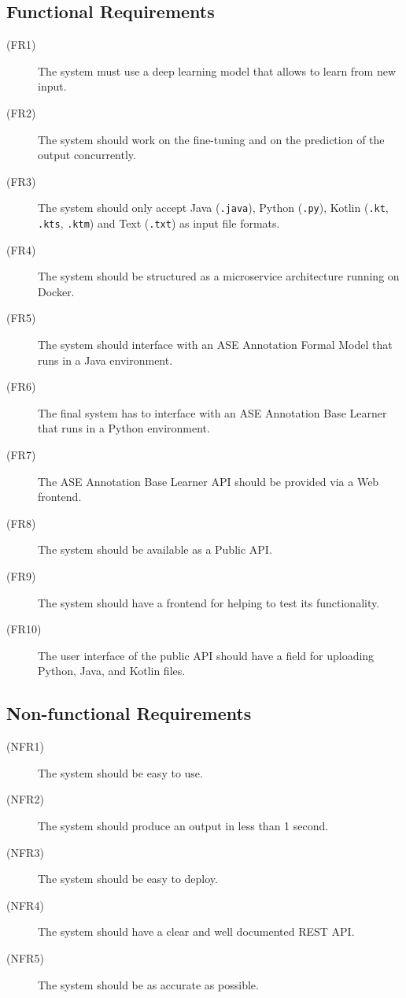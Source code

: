 \documentclass[11pt]{article}
\begin{document}
\subsection{Functional Requirements}
\begin{description}
\item[(FR1)] The system must use a deep learning model that allows to learn from new input.
\item[(FR2)] The system should work on the fine-tuning and on the prediction of the output concurrently.
\item[(FR3)] The system should only accept Java (\texttt{.java}), Python (\texttt{.py}), Kotlin (\texttt{.kt}, \texttt{.kts}, \texttt{.ktm}) and Text (\texttt{.txt}) as input file formats. 
\item[(FR4)] The system should be structured as a microservice architecture running on Docker. 
\item[(FR5)] The system should interface with an ASE Annotation Formal Model that runs in a Java environment.
\item[(FR6)] The final system has to interface with an ASE Annotation Base Learner that runs in a Python environment.
\item[(FR7)] The ASE Annotation Base Learner API should be provided via a Web frontend. 
\item[(FR8)] The system should be available as a Public API.
\item[(FR9)] The system should have a frontend for helping to test its functionality.
\item[(FR10)] The user interface of the public API should have a field for uploading Python, Java, and Kotlin files.  


\end{description}
\subsection{Non-functional Requirements}

\begin{description}
\item[(NFR1)] The system should be easy to use.
\item[(NFR2)] The system should produce an output in less than 1 second.
\item[(NFR3)] The system should be easy to deploy.
\item[(NFR4)] The system should have a clear and well documented REST API.
\item[(NFR5)] The system should be as accurate as possible.
\end{description}
\end{document}
